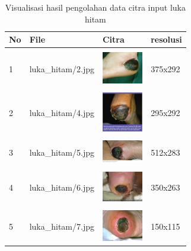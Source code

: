 \begin{table}[H]
	\centering
	\caption{Visualisasi hasil pengolahan data citra input luka hitam}
	\label{tabel_input}
	\begin{tabular}{|m{0.2in}|m{1.2in}|m{0.7in}|m{0.7in}|}
		\hline
		\textbf{No} & \textbf{File} & \textbf{Citra} & \textbf{resolusi} \\
		\hline
		
		& &  &  \\
		1 & 
		luka\_hitam/2.jpg &
		\includegraphics[width=0.7in]{gambar/dataset_citra/luka_hitam/bahan/2.jpg}&
		375x292\\
		\hline
		
		& &  &  \\
		2 & 
		luka\_hitam/4.jpg &
		\includegraphics[width=0.7in]{gambar/dataset_citra/luka_hitam/bahan/4.jpg}&
		295x292\\
		\hline
		
		& &  &  \\
		3 & 
		luka\_hitam/5.jpg &
		\includegraphics[width=0.7in]{gambar/dataset_citra/luka_hitam/bahan/5.jpg}&
		512x283\\
		\hline
		
		& &  &  \\
		4& 
		luka\_hitam/6.jpg &
		\includegraphics[width=0.7in]{gambar/dataset_citra/luka_hitam/bahan/6.jpg}&
		350x263\\
		\hline
		
		& &  &  \\
		5& 
		luka\_hitam/7.jpg &
		\includegraphics[width=0.7in]{gambar/dataset_citra/luka_hitam/bahan/7.jpg}&
		150x115\\
		\hline
		

\end{tabular}
\end{table}
